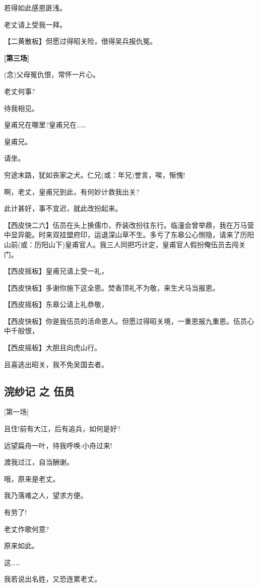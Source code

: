 若得如此感恩匪浅。

老丈请上受我一拜。

【二黄散板】但愿过得昭关险，借得吴兵报仇冤。

\textbf{{[}第三场{]}}

(念)父母冤仇恨，常怀一片心。

老丈何事?

待我相见。

皇甫兄在哪里?皇甫兄在\ldots{}\ldots{}

皇甫兄。

请坐。

穷途末路，犹如丧家之犬。仁兄(或：年兄)誉言，唉，惭愧!

啊，老丈，皇甫兄到此，有何妙计救我出关?

此计甚好，事不宜迟，就此改扮起来。

【西皮快二六】伍员在头上换儒巾，乔装改扮往东行。临潼会曾举鼎，我在万马营中显异能。时来双挂盟府印，运退深山草不生。多亏了东皋公心恻隐，请来了历阳山前(或：历阳山下)皇甫官人。我三人同把巧计定，皇甫官人假扮俺伍员去闯关门。

【西皮摇板】皇甫兄请上受一礼，

【西皮快板】多谢你施下这全恩。焚香顶礼不为敬，来生犬马当报恩。

【西皮摇板】东皋公请上礼恭敬，

【西皮快板】你是我伍员的活命恩人。但愿过得昭关境，一重恩报九重恩。伍员心中千般恨，

【西皮摇板】大胆且向虎山行。

且喜逃出昭关，我不免吴国去者。

\newpage
\hypertarget{ux6d63ux7eb1ux8bb0-ux4e4b-ux4f0dux5458}{%
\subsection{浣纱记 之
伍员}\label{ux6d63ux7eb1ux8bb0-ux4e4b-ux4f0dux5458}}

{[}第一场{]}

且住!前有大江，后有追兵，如何是好?

远望扁舟一叶，待我呼唤:小舟过来!

渡我过江，自当酬谢。

哦，原来是老丈。

我乃落难之人，望求方便。

有劳了!

老丈作歌何意?

原来如此。

这\ldots{}\ldots{}

我若说出名姓，又恐连累老丈。

